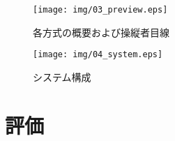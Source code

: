 \documentclass[submit, sigrecommended]{ipsj}
\begin{document}
\begin{figure*}[!tb]
  \centering
  \texttt{[image: img/03\_preview.eps]}
  \caption{各方式の概要および操縦者目線}
  \label{fig:03_preview}
\end{figure*}


\begin{figure}[tb]
  \centering
  \texttt{[image: img/04\_system.eps]}
  \caption{システム構成}
  \label{fig:04_system}
\end{figure}
  

\section{評価}
\end{document}
